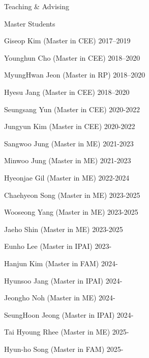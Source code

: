 \begin{rSection}{Teaching \& Advising}
\begin{rSubsection}{Master Students}{}{}{}
  \item Giseop Kim (Master in \ac{CEE}) \hfill 2017--2019
  \item Younghun Cho (Master in \ac{CEE}) \hfill 2018--2020
  \item MyungHwan Jeon (Master in \ac{RP}) \hfill 2018--2020
  \item Hyesu Jang (Master in \ac{CEE}) \hfill 2018--2020
  \item Seungsang Yun (Master in \ac{CEE}) \hfill 2020-2022
  \item Jungyun Kim (Master in \ac{CEE}) \hfill 2020-2022
  \item Sangwoo Jung (Master in \ac{ME}) \hfill 2021-2023
  \item Minwoo Jung (Master in \ac{ME}) \hfill 2021-2023
  \item Hyeonjae Gil (Master in \ac{ME}) \hfill 2022-2024
  \item Chaehyeon Song (Master in \ac{ME}) \hfill 2023-2025
  \item Wooseong Yang (Master in \ac{ME}) \hfill 2023-2025
  \item Jaeho Shin (Master in \ac{ME}) \hfill 2023-2025
  \item Eunho Lee (Master in \ac{IPAI}) \hfill 2023-
  \item Hanjun Kim (Master in \ac{FAM}) \hfill 2024-
  \item Hyunsoo Jang (Master in \ac{IPAI}) \hfill 2024-
  \item Jeongho Noh (Master in \ac{ME}) \hfill 2024-
  \item SeungHoon Jeong (Master in \ac{IPAI}) \hfill 2024-
  \item Tai Hyoung Rhee (Master in \ac{ME}) \hfill 2025-
  \item Hyun-ho Song (Master in \ac{FAM}) \hfill 2025-
\end{rSubsection}



\end{rSection}
